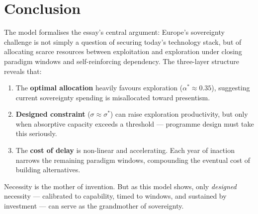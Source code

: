 \documentclass[11pt,a4paper]{article}
\theoremstyle{remark}
\begin{document}
\section{Conclusion}

The model formalises the essay's central argument: Europe's sovereignty challenge is not simply a question of securing today's technology stack, but of allocating scarce resources between exploitation and exploration under closing paradigm windows and self-reinforcing dependency. The three-layer structure reveals that:

\begin{enumerate}
    \item The \textbf{optimal allocation} heavily favours exploration ($\alpha^* \approx 0.35$), suggesting current sovereignty spending is misallocated toward presentism.
    \item \textbf{Designed constraint} ($\sigma \approx \sigma^*$) can raise exploration productivity, but only when absorptive capacity exceeds a threshold --- programme design must take this seriously.
    \item The \textbf{cost of delay} is non-linear and accelerating. Each year of inaction narrows the remaining paradigm windows, compounding the eventual cost of building alternatives.
\end{enumerate}

Necessity is the mother of invention. But as this model shows, only \emph{designed} necessity --- calibrated to capability, timed to windows, and sustained by investment --- can serve as the grandmother of sovereignty.
\end{document}
